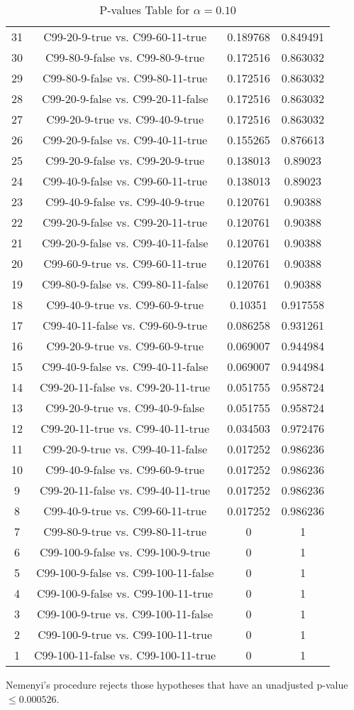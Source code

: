 \documentclass[a4paper,10pt]{article}
\begin{document}
\begin{landscape}
\begin{table}[!htp]
\begin{tabular}{cccc}
31&C99-20-9-true vs. C99-60-11-true&0.189768&0.849491\\
30&C99-80-9-false vs. C99-80-9-true&0.172516&0.863032\\
29&C99-80-9-false vs. C99-80-11-true&0.172516&0.863032\\
28&C99-20-9-false vs. C99-20-11-false&0.172516&0.863032\\
27&C99-20-9-true vs. C99-40-9-true&0.172516&0.863032\\
26&C99-20-9-false vs. C99-40-11-true&0.155265&0.876613\\
25&C99-20-9-false vs. C99-20-9-true&0.138013&0.89023\\
24&C99-40-9-false vs. C99-60-11-true&0.138013&0.89023\\
23&C99-40-9-false vs. C99-40-9-true&0.120761&0.90388\\
22&C99-20-9-false vs. C99-20-11-true&0.120761&0.90388\\
21&C99-20-9-false vs. C99-40-11-false&0.120761&0.90388\\
20&C99-60-9-true vs. C99-60-11-true&0.120761&0.90388\\
19&C99-80-9-false vs. C99-80-11-false&0.120761&0.90388\\
18&C99-40-9-true vs. C99-60-9-true&0.10351&0.917558\\
17&C99-40-11-false vs. C99-60-9-true&0.086258&0.931261\\
16&C99-20-9-true vs. C99-60-9-true&0.069007&0.944984\\
15&C99-40-9-false vs. C99-40-11-false&0.069007&0.944984\\
14&C99-20-11-false vs. C99-20-11-true&0.051755&0.958724\\
13&C99-20-9-true vs. C99-40-9-false&0.051755&0.958724\\
12&C99-20-11-true vs. C99-40-11-true&0.034503&0.972476\\
11&C99-20-9-true vs. C99-40-11-false&0.017252&0.986236\\
10&C99-40-9-false vs. C99-60-9-true&0.017252&0.986236\\
9&C99-20-11-false vs. C99-40-11-true&0.017252&0.986236\\
8&C99-40-9-true vs. C99-60-11-true&0.017252&0.986236\\
7&C99-80-9-true vs. C99-80-11-true&0&1\\
6&C99-100-9-false vs. C99-100-9-true&0&1\\
5&C99-100-9-false vs. C99-100-11-false&0&1\\
4&C99-100-9-false vs. C99-100-11-true&0&1\\
3&C99-100-9-true vs. C99-100-11-false&0&1\\
2&C99-100-9-true vs. C99-100-11-true&0&1\\
1&C99-100-11-false vs. C99-100-11-true&0&1\\
\hline
\end{tabular}
\caption{P-values Table for $\alpha=0.10$}
\end{table}Nemenyi's procedure rejects those hypotheses that have an unadjusted p-value $\le0.000526$.


\end{landscape}
\end{document}
